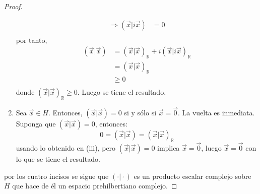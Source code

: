 \documentclass[12pt]{report}
\theoremstyle{largebreak}
\newcommand\pint[2]{\ensuremath{\left(#1\big|#2\right)}}
\begin{document}
\begin{proof}
\begin{enumerate}
\begin{equation*}
\begin{split}
                    \Rightarrow \pint{\vec{x}}{i\vec{x}} &=0\\
                \end{split}
            \end{equation*}
            por tanto,
            \begin{equation*}
                \begin{split}
                    \pint{\vec{x}}{\vec{x}}&=\pint{\vec{x}}{\vec{x}}_{\mathbb{R}}+i\pint{\vec{x}}{i\vec{x}}_{\mathbb{R}}\\
                    &=\pint{\vec{x}}{\vec{x}}_{\mathbb{R}}\\
                    &\geq0\\
                \end{split}
            \end{equation*}
            donde $\pint{\vec{x}}{\vec{x}}_{\mathbb{R}}\geq0$. Luego se tiene el resultado.
            \item Sea $\vec{x}\in H$. Entonces, $\pint{\vec{x}}{\vec{x}}=0$ si y sólo si $\vec{x}=\vec{0}$. La vuelta es inmediata. Suponga que $\pint{\vec{x}}{\vec{x}}=0$, entonces:
            \begin{equation*}
                0=\pint{\vec{x}}{\vec{x}}=\pint{\vec{x}}{\vec{x}}_{\mathbb{R}}
            \end{equation*}
            usando lo obtenido en (iii), pero $\pint{\vec{x}}{\vec{x}}=0$ implica $\vec{x}=\vec{0}$, luego $\vec{x}=\vec{0}$ con lo que se tiene el resultado.
        \end{enumerate}
        por los cuatro incisos se sigue que $\pint{\cdot}{\cdot}$ es un producto escalar complejo sobre $H$ que hace de él un espacio prehilbertiano complejo.
    \end{proof}
\end{document}
